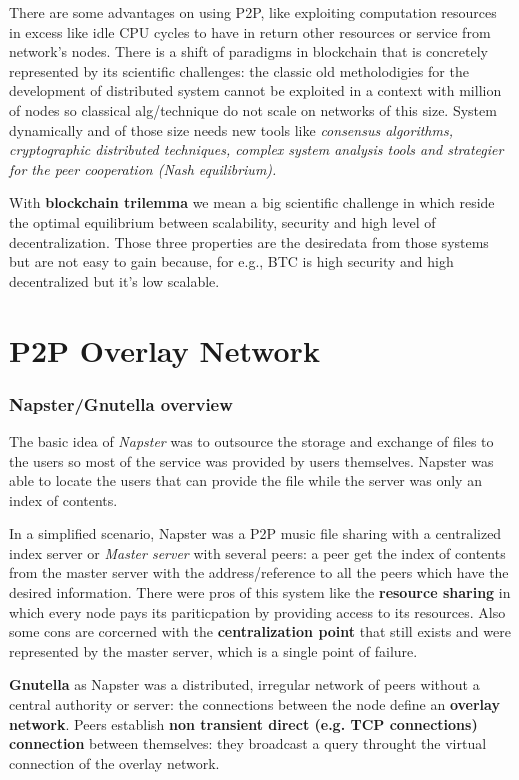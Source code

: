 \documentclass[10pt,a4paper]{report}
\begin{document}
There are some advantages on using P2P, like exploiting computation resources in excess like idle CPU cycles to have in return other resources or service from network's nodes.
There is a shift of paradigms in blockchain that is concretely represented by its scientific challenges: the classic old metholodigies for the development of distributed system cannot be exploited in a context with million of nodes so classical alg/technique do not scale on networks of this size.
System dynamically and of those size needs new tools like \textit{consensus algorithms, cryptographic distributed techniques, complex system analysis tools and strategier for the peer cooperation (Nash equilibrium).}

With \textbf{blockchain trilemma} we mean a big scientific challenge in which reside the optimal equilibrium between scalability, security and high level of decentralization. Those three properties are the desiredata from those systems but are not easy to gain because, for e.g., BTC is high security and high decentralized but it's low scalable.
\clearpage

\section{P2P Overlay Network}\label{sec:p2p-overlays---unstructured-overlays}


\subsubsection{Napster/Gnutella overview}\label{sec:napstergnutella-overview}
The basic idea of \textit{Napster} was to outsource the storage and exchange of files to the users so most of the service was provided by users themselves. Napster was able to locate the users that can provide the file while the server was only an index of contents.

In a simplified scenario, Napster was a P2P music file sharing with a centralized index server or \textit{Master server} with several peers: a peer get the index of contents from the master server with the address/reference to all the peers which have the desired information.
There were pros of this system like the \textbf{resource sharing} in which every node pays its pariticpation by providing access to its resources. Also some cons are corcerned with the \textbf{centralization point} that still exists and were represented by the master server, which is a single point of failure.

\textbf{Gnutella} as Napster was a distributed, irregular network of peers without a central authority or server: the connections between the node define an \textbf{overlay network}. Peers establish \textbf{non transient direct (e.g. TCP connections) connection} between themselves: they broadcast a query throught the virtual connection of the overlay network.
\end{document}
